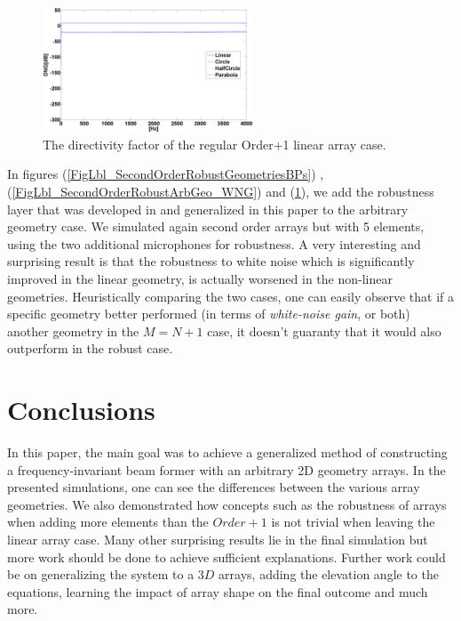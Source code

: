\documentclass{article}
\begin{document}
\begin{center}
\begin{figure}[!h]
	\end{figure}
	\begin{figure}[!h]
		\centerline{\includegraphics[width=62.5mm]{SecondOrderRobustArbGeo_DNG.png}} \caption{{The directivity factor of the regular Order+1 linear array case.}}\label{FigLbl_SecondOrderRobustArbGeo_DNG}
	\end{figure}
\end{center}
In figures (\ref{FigLbl_SecondOrderRobustGeometriesBPs}) ,(\ref{FigLbl_SecondOrderRobustArbGeo_WNG})  and (\ref{FigLbl_SecondOrderRobustArbGeo_DNG}), we add the robustness layer that was developed in \cite{sps17} and generalized in this paper to the arbitrary geometry case. We simulated again second order arrays but with 5 elements, using the two additional microphones for robustness. A very interesting and surprising result is that the robustness to white noise which is significantly improved in the linear geometry, is actually worsened in the non-linear geometries. Heuristically comparing the two cases, one can easily observe that if a specific geometry better performed (in terms of \textit{white-noise gain},  or both) another geometry in the $ M=N+1 $ case, it doesn't guaranty that it would also outperform in the robust case.   
\section{Conclusions}
In this paper, the main goal was to achieve a generalized method of constructing a frequency-invariant beam former with an arbitrary 2D geometry arrays. In the presented simulations, one can see the differences between the various array geometries. We also demonstrated how concepts such as the robustness of arrays when adding more elements than the $ Order+1 $ is not trivial when leaving the linear array case. Many other surprising results lie in the final simulation but more work should be done to achieve sufficient explanations. Further work could be on generalizing the system to a $ 3D $ arrays, adding the elevation angle to the equations, learning the impact of array shape on the final outcome and much more.


%
\end{document}
